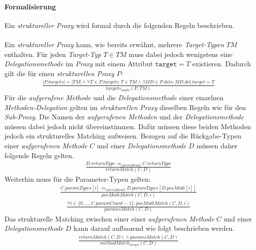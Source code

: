 \paragraph{Formalisierung}
Ein \emph{struktureller Proxy} wird formal durch die folgenden Regeln beschrieben.
\\\\
Ein \emph{struktureller Proxy} kann, wie bereits erwähnt, mehrere \emph{Target-Typen} $\mathit{TM}$ enthalten.
Für jeden \emph{Target-Typ} $T \in \mathit{TM}$ muss dabei jedoch wenigstens eine \emph{Delegationsmethode} im \emph{Proxy} mit einem Attribut $\texttt{target} = T$ existieren. Dadurch gilt die für einen \emph{strukturellen Proxy} $P$:
\begin{gather*}
\frac{|\mathit{P.targets}| = |\mathit{TM}| \wedge \forall \mathit{T} \in \mathit{P.targets}: T \in \mathit{TM} \wedge \exists \mathit{MD} \in \mathit{P.dels}:\mathit{MD.del.target} = T}{\mathit{targets_{multi}(P, \mathit{TM})}}
\end{gather*}
\noindent
Für die \emph{aufgerufene Methode} und die \emph{Delegationsmethode} einer einzelnen \emph{Methoden-Delegation} gelten im \emph{strukturellen Proxy} dieselben Regeln wie für den \emph{Sub-Proxy}. Die Namen der \emph{aufgerufenen Methoden} und der \emph{Delegationsmethode} müssen dabei jedoch nicht übereinstimmen. Dafür müssen diese beiden Methoden jedoch ein strukturelles Matching aufweisen. Bezogen auf die Rückgabe-Typen einer \emph{aufgerufenen Methode} $\mathit{C}$ und einer \emph{Delegationsmethode} $\mathit{D}$ müssen daher folgende Regeln gelten.
\begin{gather*}
\frac{\mathit{D.returnType} \Rightarrow_{internStruct} \mathit{C.returnType}}{\mathit{returnMatch(C,D)}}
\end{gather*} 
\noindent
Weiterhin muss für die Parameter-Typen gelten:
\begin{gather*}
\frac{
\mathit{C.paramTypes}[i] \Rightarrow_{internStruct} \mathit{D.paramTypes}[\mathit{D.posModi}[i]]}{\mathit{posModiMatch(C,D,i)}}
\end{gather*} 
\begin{gather*}
\frac{\forall \mathit{i} \in \{0,...,\mathit{C.paramCount}-1\}: \mathit{posModiMatch(C,D,i)}
}{\mathit{paramsMatch(C,D)}}
\end{gather*} 
\noindent
Das strukturelle Matching zwischen einer einer \emph{aufgerufenen Methode} $C$ und einer \emph{Delegationsmethode} $D$ kann darauf aufbauend wie folgt beschrieben werden.
\begin{gather*}
\frac{\mathit{returnMatch(C,D) \wedge \mathit{paramsMatch(C,D)}}}
{\mathit{methodMatch_{struct}(C,D)}}
\end{gather*}
